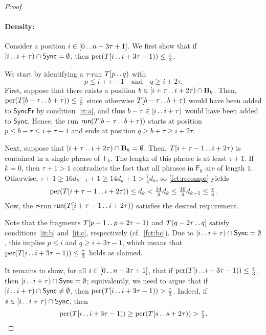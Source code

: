 \documentclass[a4paper]{article}
\theoremstyle{definition}
\theoremstyle{remark}
\newcommand{\B}{\mathbf{B}}
\newcommand{\dd}{\mathinner{\ldotp\ldotp}}
\DeclareMathOperator{\per}{per}
\renewcommand{\S}{\mathsf{Sync}}
\renewcommand{\S}{\mathsf{Sync}}
\newcommand{\F}{\mathsf{F}}
\newcommand{\SF}{\mathsf{SyncFr}}
\newcommand{\run}{\mathsf{run}}
\begin{document}
\begin{proof}
\paragraph*{\bf Density:}
Consider a position $i\in [0\dd n-3\tau+1]$.
We first show that if $[i\dd i+\tau)\cap \S = \emptyset$, then $\per(T[i\dd i+3\tau-1)) \le \tfrac{\tau}{3}$.

We start by identifying  a $\tau$-run $T[p\dd q)$ with
\[p \le i+\tau-1 \quad \text{and}\quad q\ge i+2\tau. \]
First, suppose that there exists a position $b\in [i+\tau\dd i+2\tau)\cap \B_k$.
Then, $\per(T[b-\tau\dd b+\tau))\le \frac{\tau}{3}$ since otherwise $T[b-\tau\dd b+\tau)$ would have been added to $\SF$ by condition~\ref{it:a},
and thus $b-\tau\in [i\dd i+\tau)$ would have been added to $\S$.
Hence, the run $\run(T[b-\tau\dd b+\tau))$ starts at position $p\le b-\tau \le i+\tau-1$ and ends at position $q\ge b+\tau \ge i+2\tau$.

Next, suppose that $[i+\tau\dd i+2\tau)\cap \B_k = \emptyset$.
Then, $T[i+\tau-1\dd i+2\tau)$ is contained in a single phrase of~$\F_k$.
The length of this phrase is at least $\tau+1$.
If $k=0$, then $\tau+1>1$ contradicts the fact that all phrases in $\F_0$ are of length $1$.
Otherwise, $\tau+1\ge 16d_{k-1} + 1 \ge 14d_k + 1> \frac74 d_k$, so \cref{fct:recompr} yields 
\[\per(T[i+\tau-1\dd i+2\tau))\le d_k < \tfrac{14}{3}d_k \le \tfrac{16}{3}{d_{k-1}} \le \tfrac{\tau}{3}. \]
Now, the $\tau$-run $\run(T[i+\tau-1\dd i+2\tau))$ satisfies the desired requirement.

Note that the fragments $T[p-1\dd p+2\tau-1)$ and $T(q-2\tau\dd q]$ satisfy conditions~\ref{it:b} and~\ref{it:c}, respectively (cf.\ \cref{fct:bc}).
Due to $[i\dd i+\tau)\cap \S = \emptyset$, this implies $p\le i$ and $q\ge i+3\tau-1$,
which means that $\per(T[i\dd i+3\tau-1))\le \frac{\tau}{3}$ holds as claimed.

\medskip
It remains to show, for all $i\in [0\dd n-3\tau+1]$, that
if $\per(T[i\dd i+3\tau-1)) \le \tfrac{\tau}{3}$, then $[i\dd i+\tau)\cap \S = \emptyset$;
equivalently, we need to argue that if $[i\dd i+\tau)\cap \S \ne \emptyset$, then $\per(T[i\dd i+3\tau-1)) > \tfrac{\tau}{3}$.
Indeed, if $s\in [i\dd i+\tau)\cap \S$,
then \[\per(T[i\dd i+3\tau-1))\ge \per(T[s\dd s+2\tau)) > \tfrac{\tau}{3}.\] 


\end{proof}
\end{document}
